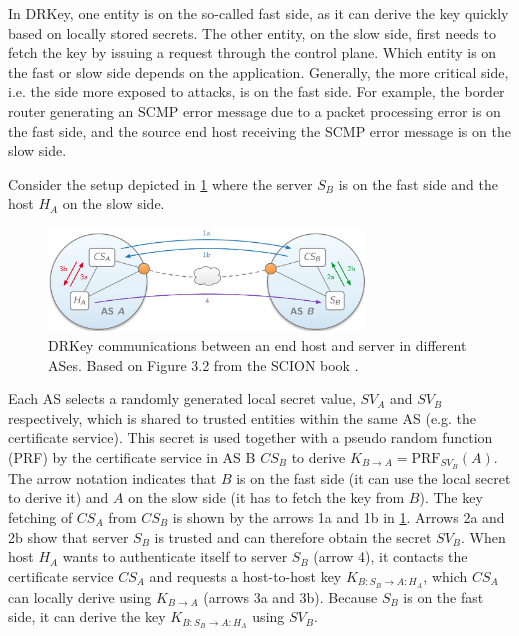In DRKey, one entity is on the so-called fast side, as it can derive the key quickly based on locally stored secrets.
The other entity, on the slow side, first needs to fetch the key by issuing a request through the control plane.
Which entity is on the fast or slow side depends on the application.
Generally, the more critical side, i.e. the side more exposed to attacks, is on the fast side.
For example, the border router generating an SCMP error message due to a packet processing error is on the fast side, and the source end host receiving the SCMP error message is on the slow side.

Consider the setup depicted in \cref{fig:drkey_setup} where the server $S_B$ is on the fast side and the host $H_A$ on the slow side.
\begin{figure}[h]
    \centering
    \includegraphics[width=0.75\textwidth]{figures/drkey_topo.png}
    \caption{DRKey communications between an end host and server in different ASes. Based on Figure 3.2 from the SCION book \cite{Perrig2022}.}
    \label{fig:drkey_setup}
\end{figure}

Each AS selects a randomly generated local secret value, $SV_A$ and $SV_B$ respectively, which is shared to trusted entities within the same AS (e.g. the certificate service).
This secret is used together with a pseudo random function (PRF) by the certificate service in AS B $CS_B$ to derive $K_{B \rightarrow A} = \text{PRF}_{SV_B}(A)$.
The arrow notation indicates that $B$ is on the fast side (it can use the local secret to derive it) and $A$ on the slow side (it has to fetch the key from $B$).
The key fetching of $CS_A$ from $CS_B$ is shown by the arrows 1a and 1b in \cref{fig:drkey_setup}.
Arrows 2a and 2b show that server $S_B$ is trusted and can therefore obtain the secret $SV_B$.
When host $H_A$ wants to authenticate itself to server $S_B$ (arrow 4), it contacts the certificate service $CS_A$ and requests a host-to-host key $K_{B:S_B \rightarrow A:H_A}$, which $CS_A$ can locally derive using $K_{B \rightarrow A}$ (arrows 3a and 3b).
Because $S_B$ is on the fast side, it can derive the key $K_{B:S_B \rightarrow A:H_A}$ using $SV_B$.

